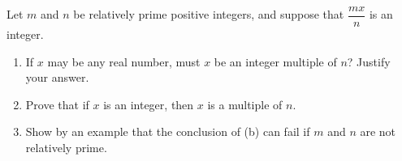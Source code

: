 Let $m$ and $n$ be relatively prime positive integers, and suppose that $\dfrac{mx}{n}$ is an integer.
\begin{enumerate}
\item[(a)] If $x$ may be any real number, must $x$ be an integer multiple of $n$? Justify your answer.
\item[(b)] Prove that if $x$ is an integer, then $x$ is a multiple of $n$.
\item[(c)] Show by an example that the conclusion of (b) can fail if $m$ and $n$ are not relatively prime.
\end{enumerate}
